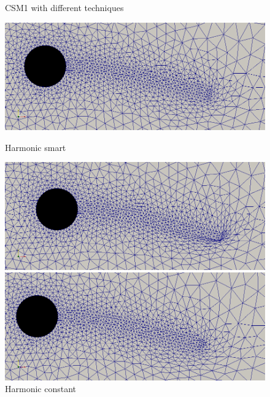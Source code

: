 \begin{figure}[H]  \label{fig:CSM1_pictures} 
  \caption {CSM1 with different techniques}
  \begin{minipage}[b]{0.5\linewidth}
    \centering
    \includegraphics[scale=0.2]{./Verification_Validation/Mesh_motion_results/CSM1_laplace.png} 
    \caption{Harmonic smart} 
    \vspace{4ex}
  \end{minipage}%
  \begin{minipage}[b]{0.5\linewidth}
    \centering
    \includegraphics[scale=0.2]{./Verification_Validation/Mesh_motion_results/CSM1_constant.png} 
    \caption{Harmonic constant} 
    \vspace{4ex}
  \end{minipage} 
  \begin{minipage}[b]{0.5\linewidth}
    \centering
    \includegraphics[scale=0.2]{./Verification_Validation/Mesh_motion_results/CSM1_bibc1.png} 

\end{minipage}
\end{figure}

